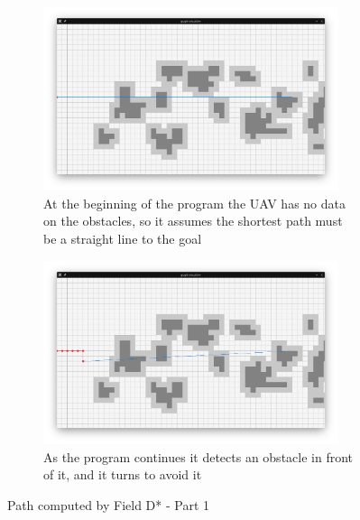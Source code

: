 \begin{figure}
	\begin{center}
		\begin{subfigure}[t]{\textwidth}
			\includegraphics[width=0.95\textwidth]{./img/gv_1.png}
			\caption{At the beginning of the program the UAV has no data on the obstacles, so it assumes the shortest path must be a straight line to the goal}\label{fig:gv-1}
		\end{subfigure}
		\begin{subfigure}[t]{\textwidth}
			\includegraphics[width=0.95\textwidth]{./img/gv_2.png}
			\caption{As the program continues it detects an obstacle in front of it, and it turns to avoid it}\label{fig:gv-2}
		\end{subfigure}
	\end{center}
	\caption{Path computed by Field D* - Part 1}\label{fig:gv-a}
\end{figure}
